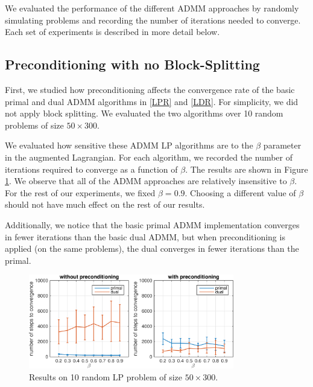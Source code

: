 \documentclass{article}
\begin{document}
We evaluated the performance of the different ADMM approaches by randomly simulating problems and recording the number of iterations needed to converge. Each set of experiments is described in more detail below.

\subsection*{Preconditioning with no Block-Splitting}

First, we studied how preconditioning affects the convergence rate of the basic primal and dual ADMM algorithms in \eqref{LPR} and \eqref{LDR}. For simplicity, we did not apply block splitting. We evaluated the two algorithms over 10 random problems of size $50 \times 300$. 

We evaluated how sensitive these ADMM LP algorithms are to the $\beta$ parameter in the augmented Lagrangian. For each algorithm, we recorded the number of iterations required to converge as a function of $\beta$. The results  are shown in Figure \ref{fig:base_p_d}. We observe that all of the ADMM approaches are relatively insensitive to $\beta$. For the rest of our experiments, we fixed $\beta=0.9$. Choosing a different value of $\beta$ should not have much effect on the rest of our results. 

Additionally, we notice that the basic primal ADMM implementation converges in fewer iterations than the basic dual ADMM, but when preconditioning is applied (on the same problems), the dual converges in fewer iterations than the primal.
\newline
\newline
\newline
\begin{figure}[ht]
	\centering
	\includegraphics[width=0.8\textwidth]{../figures/primal_dual_preconditioning.png}
	\caption{Results on 10 random LP problem of size $50 \times 300$. }
	\label{fig:base_p_d}
\end{figure}
\newpage
\end{document}
